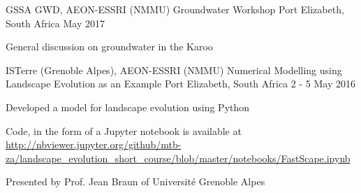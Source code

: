 


\begin{cventries}


\cventry
{GSSA GWD, AEON-ESSRI (NMMU)} %
{Groundwater Workshop} %
{Port Elizabeth, South Africa} %
{May 2017} %
{ %
\begin{cvitems}
\item {General discussion on groundwater in the Karoo}
\end{cvitems}
}


\cventry
{ISTerre (Grenoble Alpes), AEON-ESSRI (NMMU)} %
{Numerical Modelling using Landscape Evolution as an Example} %
{Port Elizabeth, South Africa} %
{2 - 5 May 2016} %
{ %
\begin{cvitems}
\item {Developed a model for landscape evolution using Python}
\item {Code, in the form of a Jupyter notebook is available at \url{http://nbviewer.jupyter.org/github/mtb-za/landscape_evolution_short_course/blob/master/notebooks/FastScape.ipynb}}
\item {Presented by Prof. Jean Braun of Universit\'{e} Grenoble Alpes}
\end{cvitems}
}



\end{cventries}
